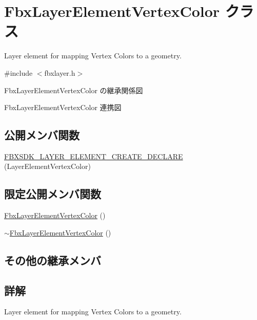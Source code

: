 \hypertarget{class_fbx_layer_element_vertex_color}{}\section{Fbx\+Layer\+Element\+Vertex\+Color クラス}
\label{class_fbx_layer_element_vertex_color}


Layer element for mapping Vertex Colors to a geometry.  




{\ttfamily \#include $<$fbxlayer.\+h$>$}



Fbx\+Layer\+Element\+Vertex\+Color の継承関係図


Fbx\+Layer\+Element\+Vertex\+Color 連携図
\subsection*{公開メンバ関数}
\begin{DoxyCompactItemize}
\item 
\hyperlink{class_fbx_layer_element_vertex_color_a59477554ceb7a1082b9c0f6dd849626d}{F\+B\+X\+S\+D\+K\+\_\+\+L\+A\+Y\+E\+R\+\_\+\+E\+L\+E\+M\+E\+N\+T\+\_\+\+C\+R\+E\+A\+T\+E\+\_\+\+D\+E\+C\+L\+A\+RE} (Layer\+Element\+Vertex\+Color)
\end{DoxyCompactItemize}
\subsection*{限定公開メンバ関数}
\begin{DoxyCompactItemize}
\item 
\hyperlink{class_fbx_layer_element_vertex_color_a8b87bc51727c07c284d11acae71bca51}{Fbx\+Layer\+Element\+Vertex\+Color} ()
\item 
\hyperlink{class_fbx_layer_element_vertex_color_ab161106e55d95e1b21eec49f56296f30}{$\sim$\+Fbx\+Layer\+Element\+Vertex\+Color} ()
\end{DoxyCompactItemize}
\subsection*{その他の継承メンバ}


\subsection{詳解}
Layer element for mapping Vertex Colors to a geometry. 


